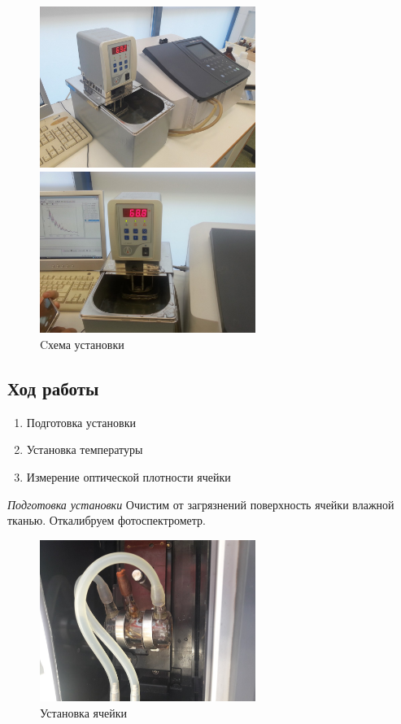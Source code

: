 \documentclass[a4paper,12pt]{article} %
\begin{document}
\begin{figure}[h]
	\begin{center}
		\begin{minipage}{0.45 \linewidth}
			\includegraphics[width = 7cm]{termostat.jpg}
		\end{minipage}
		\qquad
		\begin{minipage}{0.45 \linewidth}
			\includegraphics[width = 7cm]{term.jpg}
		\end{minipage}
	\end{center}
	\caption{Cхема установки}
\end{figure}

\subsection*{Ход работы}
\begin{enumerate}
	\item Подготовка установки
	\item Установка температуры
	\item Измерение оптической плотности ячейки
\end{enumerate}


\emph{Подготовка установки}
Очистим от загрязнений поверхность ячейки влажной тканью. Откалибруем фотоспектрометр.


\begin{figure}
	
		\begin{center}
			\includegraphics[width = 7cm]{section.jpg}
		\end{center}
	
	\caption{Установка ячейки}
\end{figure}
\end{document}
